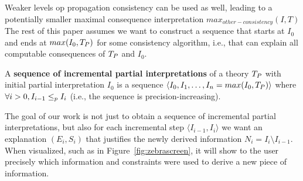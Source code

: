 Weaker levels op propagation consistency can be used as well, leading to a potentially smaller maximal consequence interpretation $max_{other-consistency}(I,T)$
The rest of this paper assumes we want to construct a sequence that starts at $I_0$ and ends at $max(I_0,T_P)$ for some consistency algorithm, i.e., that can explain all computable consequences of $T_P$ and $I_0$. %


% 




\begin{definition}
A \textbf{sequence of incremental partial interpretations} of a theory $T_P$ with initial partial interpretation $I_0$ is a sequence $\langle I_0, I_1, \ldots, I_n  = max(I_0,T_P)\rangle$ where $\forall i>0, I_{i-1} \leq_p I_{i}$ (i.e., the sequence is precision-increasing).
\end{definition} 

The goal of our work is not just to obtain a sequence of incremental partial interpretations, but also 
% 
for each incremental step $\langle I_{i-1}, I_i \rangle$ we want an explanation $(E_i,S_i)$ that justifies the newly derived information $N_i = I_i \setminus I_{i-1}$. When visualized, such as in Figure~\ref{fig:zebrascreen}, it will show to the user precisely which information and constraints were used to derive a new piece of information.

